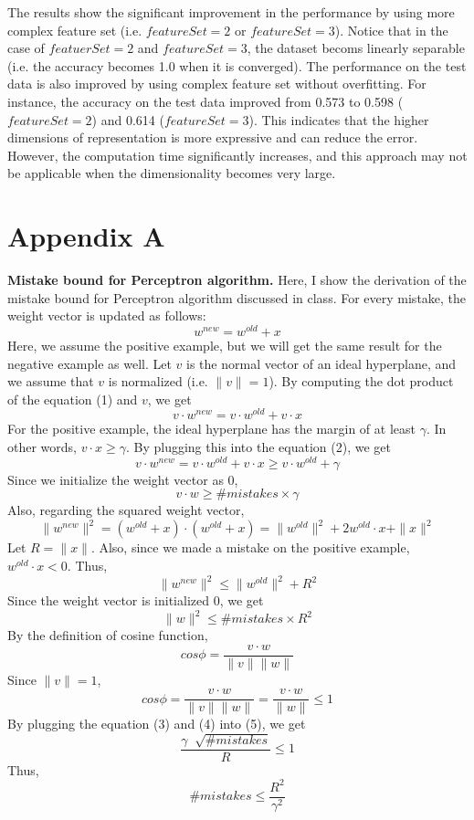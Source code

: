 The results show the significant improvement in the performance by using more complex feature set (i.e. $featureSet = 2$ or $featureSet = 3$). Notice that in the case of $featuerSet=2$ and $featureSet=3$, the dataset becoms linearly separable (i.e. the accuracy becomes 1.0 when it is converged). The performance on the test data is also improved by using complex feature set without overfitting. For instance, the accuracy on the test data improved from 0.573 to 0.598 ($featureSet=2$) and 0.614 ($featureSet=3$). This indicates that the higher dimensions of representation is more expressive and can reduce the error. However, the computation time significantly increases, and this approach may not be applicable when the dimensionality becomes very large.

\section*{Appendix A}
{\bf Mistake bound for Perceptron algorithm.} Here, I show the derivation of the mistake bound for Perceptron algorithm discussed in class. For every mistake, the weight vector is updated as follows:
\begin{equation}
w^{new}=w^{old}+x
\end{equation}
Here, we assume the positive example, but we will get the same result for the negative example as well. Let $v$ is the normal vector of an ideal hyperplane, and we assume that $v$ is normalized (i.e. $\|v\|=1$). By computing the dot product of the equation (1) and $v$, we get
\begin{equation}
v \cdot w^{new}=v \cdot w^{old}+v \cdot x
\end{equation}
For the positive example, the ideal hyperplane has the margin of at least $\gamma$. In other words, $v \cdot x \ge \gamma$. By plugging this into the equation (2), we get
\[
v \cdot w^{new}=v \cdot w^{old}+v \cdot x \ge v \cdot w^{old} + \gamma
\]
Since we initialize the weight vector as 0,
\begin{equation}
v \cdot w \ge \#mistakes \times \gamma
\end{equation}
Also, regarding the squared weight vector,
\[
\|w^{new}\|^2=(w^{old}+x) \cdot (w^{old}+x) =\|w^{old}\|^2 + 2w^{old} \cdot x + \|x\|^2
\]
Let $R=\|x\|$. Also, since we made a mistake on the positive example, $w^{old} \cdot x < 0$. Thus,
\[
\|w^{new}\|^2 \le \|w^{old}\|^2 + R^2
\]
Since the weight vector is initialized 0, we get
\begin{equation}
\|w\|^2 \le \#mistakes \times R^2
\end{equation}
By the definition of cosine function,
\[
cos \phi = \frac{v \cdot w}{\|v\|\|w\|}
\]
Since $\|v\|=1$,
\begin{equation}
cos \phi = \frac{v \cdot w}{\|v\|\|w\|}=\frac{v \cdot w}{\|w\|} \le 1
\end{equation}
By plugging the equation (3) and (4) into (5), we get
\[
\frac{\gamma \; \sqrt[]{\#mistakes}}{R} \le 1
\]
Thus,
\begin{equation}
\# mistakes \le \frac{R^2}{\gamma^2}
\end{equation}



